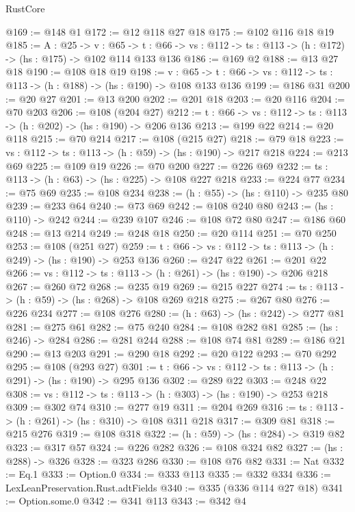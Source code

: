\begin{lexlean}{RustCore}
\begin{coremodule}
@169 := @148 @1
@172 := @12 @118 @27 @18
@175 := @102 @116 @18 @19
@185 := {A : @25} ->
  {v : @65} ->
  {t : @66} -> {vs : @112} -> {ts : @113} -> (h : @172) -> (hs : @175) -> @102 @114 @133 @136
@186 := @169 @2
@188 := @13 @27 @18
@190 := @108 @18 @19
@198 := {v : @65} ->
  {t : @66} -> {vs : @112} -> {ts : @113} -> (h : @188) -> (hs : @190) -> @108 @133 @136
@199 := @186 @31
@200 := @20 @27
@201 := @13 @200
@202 := @201 @18
@203 := @20 @116
@204 := @70 @203
@206 := @108 (@204 @27)
@212 := {t : @66} -> {vs : @112} -> {ts : @113} -> (h : @202) -> (hs : @190) -> @206 @136
@213 := @199 @22
@214 := @20 @118
@215 := @70 @214
@217 := @108 (@215 @27)
@218 := @79 @18
@223 := {vs : @112} -> {ts : @113} -> (h : @59) -> (hs : @190) -> @217 @218
@224 := @213 @69
@225 := @109 @19
@226 := @70 @200
@227 := @226 @69
@232 := {ts : @113} -> (h : @63) -> (hs : @225) -> @108 @227 @218
@233 := @224 @77
@234 := @75 @69
@235 := @108 @234
@238 := (h : @55) -> (hs : @110) -> @235 @80
@239 := @233 @64
@240 := @73 @69
@242 := @108 @240 @80
@243 := (hs : @110) -> @242
@244 := @239 @107
@246 := @108 @72 @80
@247 := @186 @60
@248 := @13 @214
@249 := @248 @18
@250 := @20 @114
@251 := @70 @250
@253 := @108 (@251 @27)
@259 := {t : @66} -> {vs : @112} -> {ts : @113} -> (h : @249) -> (hs : @190) -> @253 @136
@260 := @247 @22
@261 := @201 @22
@266 := {vs : @112} -> {ts : @113} -> (h : @261) -> (hs : @190) -> @206 @218
@267 := @260 @72
@268 := @235 @19
@269 := @215 @227
@274 := {ts : @113} -> (h : @59) -> (hs : @268) -> @108 @269 @218
@275 := @267 @80
@276 := @226 @234
@277 := @108 @276
@280 := (h : @63) -> (hs : @242) -> @277 @81
@281 := @275 @61
@282 := @75 @240
@284 := @108 @282 @81
@285 := (hs : @246) -> @284
@286 := @281 @244
@288 := @108 @74 @81
@289 := @186 @21
@290 := @13 @203
@291 := @290 @18
@292 := @20 @122
@293 := @70 @292
@295 := @108 (@293 @27)
@301 := {t : @66} -> {vs : @112} -> {ts : @113} -> (h : @291) -> (hs : @190) -> @295 @136
@302 := @289 @22
@303 := @248 @22
@308 := {vs : @112} -> {ts : @113} -> (h : @303) -> (hs : @190) -> @253 @218
@309 := @302 @74
@310 := @277 @19
@311 := @204 @269
@316 := {ts : @113} -> (h : @261) -> (hs : @310) -> @108 @311 @218
@317 := @309 @81
@318 := @215 @276
@319 := @108 @318
@322 := (h : @59) -> (hs : @284) -> @319 @82
@323 := @317 @57
@324 := @226 @282
@326 := @108 @324 @82
@327 := (hs : @288) -> @326
@328 := @323 @286
@330 := @108 @76 @82
@331 := Nat
@332 := Eq.{1}
@333 := Option.{0}
@334 := @333 @113
@335 := @332 @334
@336 := LexLeanPreservation.Rust.adtFields
@340 := @335 (@336 @114 @27 @18)
@341 := Option.some.{0}
@342 := @341 @113
@343 := @342 @4

\end{coremodule}
\end{lexlean}
